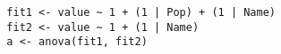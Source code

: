 \documentclass{article}
\begin{document}
\begin{verbatim}
  fit1 <- value ~ 1 + (1 | Pop) + (1 | Name)
  fit2 <- value ~ 1 + (1 | Name)
  a <- anova(fit1, fit2)
\end{verbatim}
\end{document}
